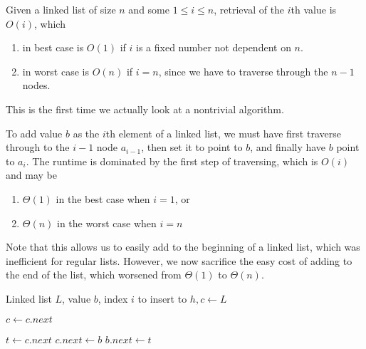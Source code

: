   \begin{algo}
    Given a linked list of size $n$ and some $1 \leq i \leq n$, retrieval of the $i$th value is $O(i)$, which 
    \begin{enumerate}
      \item in best case is $O(1)$ if $i$ is a fixed number not dependent on $n$. 
      \item in worst case is $O(n)$ if $i = n$, since we have to traverse through the $n-1$ nodes. 
    \end{enumerate}
  \end{algo}

  This is the first time we actually look at a nontrivial algorithm. 

  \begin{algo}
    To add value $b$ as the $i$th element of a linked list, we must have first traverse through to the $i-1$ node $a_{i-1}$, then set it to point to $b$, and finally have $b$ point to $a_{i}$. The runtime is dominated by the first step of traversing, which is $O(i)$ and may be 
    \begin{enumerate}
      \item $\Theta(1)$ in the best case when $i=1$, or 
      \item $\Theta(n)$ in the worst case when $i=n$
    \end{enumerate}
    Note that this allows us to easily add to the beginning of a linked list, which was inefficient for regular lists. However, we now sacrifice the easy cost of adding to the end of the list, which worsened from $\Theta(1)$ to $\Theta(n)$. 

    \begin{algorithmic}[1]
      \State Linked list $L$, value $b$, index $i$ to insert to 
      \State $h, c \gets L$  
      
        \State $c \gets c.next$
      \EndFor 

      \State $t \gets c.next$  
      \State $c.next \gets b$  
      \State $b.next \gets t$   
      \State {} 
      \EndProcedure
    \end{algorithmic}
  \end{algo}

